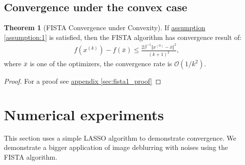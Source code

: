 \documentclass[]{article}
\theoremstyle{definition}
\newtheorem{theorem}{Theorem}       %
\begin{document}
    \subsection{Convergence under the convex case}
        \begin{theorem}[FISTA Convergence under Convexity]\label{thm:fista_convergence1}
            If \hyperref[assumption:1]{assumption \ref*{assumption:1}} is satisfied, then the FISTA algorithm has convergence result of: 
            \begin{align*}
                f(x^{(k)}) - f(\bar x) \le 
                \frac{2\beta^{-1}\Vert x^{(0)} - \bar x\Vert^2}
            {(k + 1)^2},
            \end{align*}
            where $\bar x$ is one of the optimizers, the convergence rate is $\mathcal O(1/k^2)$. 
        \end{theorem}
        \begin{proof}
            For a proof see \hyperref[sec:fista1_proof]{appendix \ref*{sec:fista1_proof}}
        \end{proof}

\section{Numerical experiments}\label{sec:numerical_experiments}
    This section uses a simple LASSO algorithm to demonstrate convergence. We demonstrate a bigger application of image deblurring with noises using the FISTA algorithm. 
\end{document}
